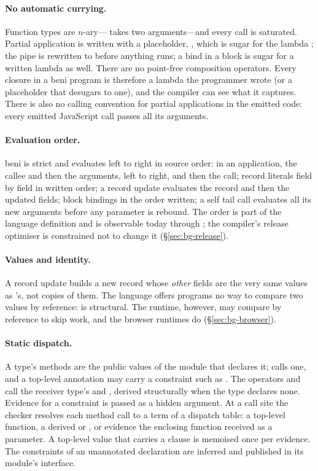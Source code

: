 \paragraph{No automatic currying.} Function types are $n$-ary--- takes two
arguments---and every call is saturated. Partial application is written with a placeholder,
, which is sugar for the lambda ; the pipe  is rewritten
to  before anything runs; a bind  in a block is sugar for a written
lambda as well. There are no point-free composition operators. Every closure in a beni program is
therefore a lambda the programmer wrote (or a placeholder that desugars to one), and the compiler can
see what it captures. There is also no calling convention for partial applications in the emitted
code: every emitted JavaScript call passes all its arguments.

\paragraph{Evaluation order.} beni is strict and evaluates left to right in source order: in an
application, the callee and then the arguments, left to right, and then the call; record literals
field by field in written order; a record update evaluates the record and then the updated fields;
block bindings in the order written; a self tail call evaluates all its new arguments before any
parameter is rebound. The order is part of the language definition and is observable today through
; the compiler's release optimiser is constrained not to change it
(\S\ref{sec:bg-release}).

\paragraph{Values and identity.} A record update  builds a new record whose
\emph{other} fields are the very same values as 's, not copies of them. The language offers
programs no way to compare two values by reference: \code{==} is structural. The runtime, however,
may compare by reference to skip work, and the browser runtimes do (\S\ref{sec:bg-browser}).

\paragraph{Static dispatch.} A type's methods are the public values of the module that declares
it;  calls one, and a top-level annotation may carry a constraint such as
. The operators \code{==} and \code{<} call the receiver type's
 and , derived structurally when the type declares none. Evidence for a
constraint is passed as a hidden argument. At a call site the checker resolves each method call to a
term of a dispatch table: a top-level function, a derived  or , or evidence the
enclosing function received as a parameter. A top-level value that carries a  clause is
memoised once per evidence. The constraints of an unannotated declaration are inferred and published
in its module's interface.

